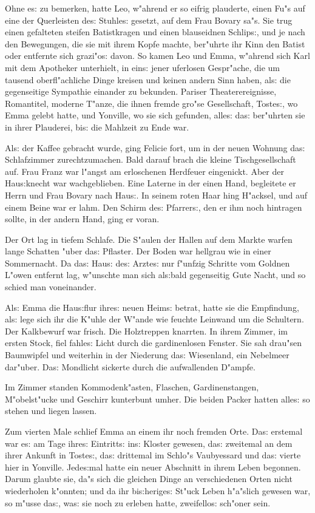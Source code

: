 \documentclass[oneside,12pt]{book}
\newcommand{\s}{s:}%
\begin{document}
Ohne e{\s} zu bemerken, hatte Leo, w"ahrend er so eifrig
plauderte, einen Fu"s auf eine der Querleisten de{\s} Stuhle{\s}
gesetzt, auf dem Frau Bovary sa"s. Sie trug einen gefalteten
steifen Batistkragen und einen blauseidnen Schlip{\s}, und je nach
den Bewegungen, die sie mit ihrem Kopfe machte, ber"uhrte ihr Kinn
den Batist oder entfernte sich grazi"o{\s} davon. So kamen Leo und
Emma, w"ahrend sich Karl mit dem Apotheker unterhielt, in ein{\s}
jener uferlosen Gespr"ache, die um tausend oberfl"achliche Dinge
kreisen und keinen andern Sinn haben, al{\s} die gegenseitige
Sympathie einander zu bekunden. Pariser Theaterereignisse,
Romantitel, moderne T"anze, die ihnen fremde gro"se Gesellschaft,
Toste{\s}, wo Emma gelebt hatte, und Yonville, wo sie sich
gefunden, alle{\s} da{\s} ber"uhrten sie in ihrer Plauderei,
bi{\s} die Mahlzeit zu Ende war.

Al{\s} der Kaffee gebracht wurde, ging Felicie fort, um in der
neuen Wohnung da{\s} Schlafzimmer zurechtzumachen. Bald darauf
brach die kleine Tischgesellschaft auf. Frau Franz war l"angst am
erloschenen Herdfeuer eingenickt. Aber der Hau{\s}knecht war
wachgeblieben. Eine Laterne in der einen Hand, begleitete er Herrn
und Frau Bovary nach Hau{\s}. In seinem roten Haar hing H"acksel,
und auf einem Beine war er lahm. Den Schirm de{\s} Pfarrer{\s},
den er ihm noch hintragen sollte, in der andern Hand, ging er
voran.

Der Ort lag in tiefem Schlafe. Die S"aulen der Hallen auf dem
Markte warfen lange Schatten "uber da{\s} Pflaster. Der Boden war
hellgrau wie in einer Sommernacht. Da da{\s} Hau{\s} de{\s}
Arzte{\s} nur f"unfzig Schritte vom Goldnen L"owen entfernt lag,
w"unschte man sich al{\s}bald gegenseitig Gute Nacht, und so
schied man voneinander.

Al{\s} Emma die Hau{\s}flur ihre{\s} neuen Heim{\s} betrat, hatte
sie die Empfindung, al{\s} lege sich ihr die K"uhle der W"ande wie
feuchte Leinwand um die Schultern. Der Kalkbewurf war frisch. Die
Holztreppen knarrten. In ihrem Zimmer, im ersten Stock, fiel
fahle{\s} Licht durch die gardinenlosen Fenster. Sie sah drau"sen
Baumwipfel und weiterhin in der Niederung da{\s} Wiesenland, ein
Nebelmeer dar"uber. Da{\s} Mondlicht sickerte durch die
aufwallenden D"ampfe.

Im Zimmer standen Kommodenk"asten, Flaschen, Gardinenstangen,
M"o\-bel\-st"ucke und Geschirr kunterbunt umher. Die beiden
Packer hatten alle{\s} so stehen und liegen lassen.

Zum vierten Male schlief Emma an einem ihr noch fremden Orte.
Da{\s} erstemal war e{\s} am Tage ihre{\s} Eintritt{\s} in{\s}
Kloster gewesen, da{\s} zweitemal an dem ihrer Ankunft in
Toste{\s}, da{\s} drittemal im Schlo"s Vaubyessard und da{\s}
vierte hier in Yonville. Jede{\s}mal hatte ein neuer Abschnitt in
ihrem Leben begonnen. Darum glaubte sie, da"s sich die gleichen
Dinge an verschiedenen Orten nicht wiederholen k"onnten; und da
ihr bi{\s}herige{\s} St"uck Leben h"a"slich gewesen war, so m"usse
da{\s}, wa{\s} sie noch zu erleben hatte, zweifello{\s} sch"oner
sein.
\end{document}

